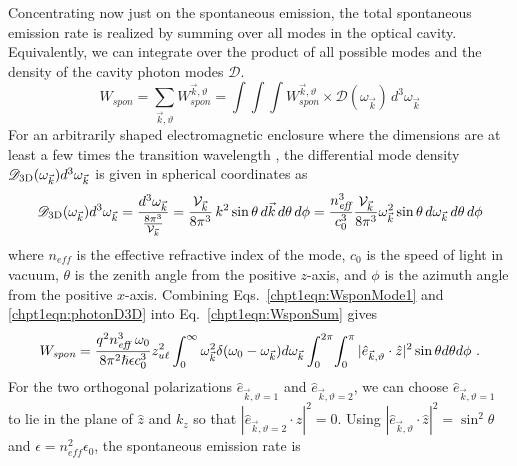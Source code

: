 {Concentrating now just on the spontaneous emission, the total spontaneous emission rate is realized by summing over all modes in the optical cavity.  Equivalently, we can integrate over the product of all possible modes and the density of the cavity photon modes $\mathscr{D}$.
\begin{equation}
\label{chpt1eqn:WsponSum}
W_\textit{spon}=\sum_{\vec{k},\vartheta} W_\textit{spon}^{\vec{k},\vartheta} = \int \! \int \!\int W_\textit{spon}^{\vec{k},\vartheta} \times \mathscr{D}(\omega_{\vec{k}}) \, d^3 \omega_{\vec{k}}
\end{equation}
For an arbitrarily shaped electromagnetic enclosure where the dimensions are at least a few times the transition wavelength \cite{Smet:JAP:1996}, the differential mode density $\mathscr{D}_{\textnormal{3D}}(\omega_{\vec{k}}) d^3\omega_{\vec{k}}$ is given in spherical coordinates as \cite{SalehTeich:book:1991}%
\begin{equation}
\label{chpt1eqn:photonD3D}
\mathscr{D}_{\textnormal{3D}}(\omega_{\vec{k}}) d^3\omega_{\vec{k}} = \frac{d^3\omega_{\vec{k}}}{\frac{8 \pi^3}{\mathcal{V}_{\vec{k}}}} = \frac{\mathcal{V}_{\vec{k}}}{8 \pi^3} \, k^2 \sin \theta \, d\vec{k} \, d\theta \, d\phi = \frac{n_\textit{eff}^3}{c_0^3} \frac{\mathcal{V}_{\vec{k}}}{8 \pi^3} \omega_{\vec{k}}^2 \sin\theta \, d\omega_{\vec{k}} \, d\theta \, d\phi
\end{equation}
where $n_\textit{eff}$ is the effective refractive index of the mode, $c_0$ is the speed of light in vacuum, $\theta$ is the zenith angle from the positive $z$-axis, and $\phi$ is the azimuth angle from the positive $x$-axis. Combining Eqs.~\eqref{chpt1eqn:WsponMode1} and \eqref{chpt1eqn:photonD3D} into Eq.~\eqref{chpt1eqn:WsponSum} gives
\begin{equation}
W_\textit{spon}=\frac{q^2 n_\textit{eff}^3 \;\omega_0}{8 \pi^2 \hslash \epsilon c_0^3} z_{u\ell}^2 \int_0^\infty \omega_{\vec{k}}^2 \delta(\omega_0 - \omega_{\vec{k}}) d\omega_{\vec{k}} \int_0^{2\pi}\!\int_0^{\pi}|\hat{e}_{\vec{k},\vartheta} \cdot \hat{z}|^2 \sin \theta d\theta d\phi \textnormal{~.}
\end{equation}
For the two orthogonal polarizations $\hat{e}_{\vec{k},\vartheta=1}$ and $\hat{e}_{\vec{k},\vartheta=2}$, we can choose $\hat{e}_{\vec{k},\vartheta=1}$ to lie in the plane of $\hat{z}$ and $k_z$ so that $|\hat{e}_{\vec{k},\vartheta=2}\cdot \hat{z}|^2=0$.  Using $|\hat{e}_{\vec{k},\vartheta} \cdot \hat{z}|^2=\sin^2\theta$ and $\epsilon=n_\textit{eff}^2 \epsilon_0$, the spontaneous emission rate is \cite{Yariv:book:1989} \cite{Parker:book:2005} \cite{Smet:JAP:1996}  \cite{Rosencher:book:2002}
}
